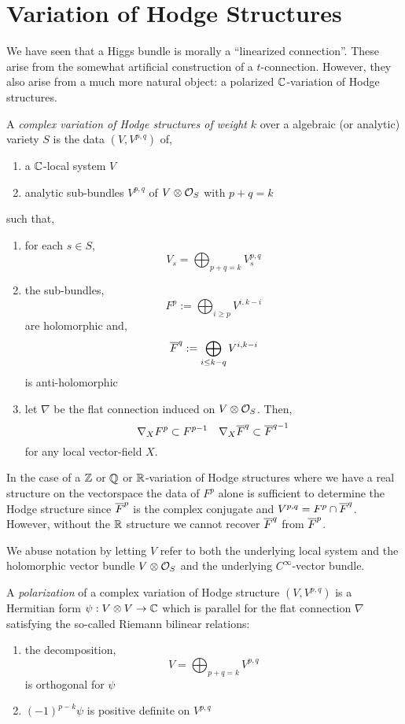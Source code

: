 \documentclass[12pt]{article}
\begin{document}
\section{Variation of Hodge Structures}

We have seen that a Higgs bundle is morally a ``linearized connection''. These arise from the somewhat artificial construction of a $t$-connection. However, they also arise from a much more natural object: a polarized $\mathbb{C}$-variation of Hodge structures. 

\begin{defn}
A \textit{complex variation of Hodge structures of weight} $k$ over a algebraic (or analytic) variety $S$ is the data $(V, V^{p,q})$ of,
\begin{enumerate}
\item a $\mathbb{C}$-local system $V$
\item analytic sub-bundles $V^{p,q}$ of $V \otimes \mathcal{O}_{S}$ with $p + q = k$
\end{enumerate}
such that,
\begin{enumerate}
\item for each $s \in S$,
\[ V_s = \bigoplus_{p+q=k} V^{p,q}_s \]
\item the sub-bundles,
\[ F^p := \bigoplus_{i \ge p} V^{i, k - i} \]
are holomorphic and,
\[ \overline{F}^q := \bigoplus_{i \le k-q} V^{i, k-i} \]
is anti-holomorphic
\item let $\nabla$ be the flat connection induced on $V \otimes \mathcal{O}_{S}$. Then,
\[ \nabla_X F^p \subset F^{p-1} \quad \nabla_X \overline{F}^q \subset \overline{F}^{q-1} \]
for any local vector-field $X$. 
\end{enumerate}
\end{defn}

\begin{rmk}
In the case of a $\mathbb{Z}$ or $\mathbb{Q}$ or $\mathbb{R}$-variation of Hodge structures where we have a real structure on the vectorspace the data of $F^p$ alone is sufficient to determine the Hodge structure since $\overline{F}^p$ is the complex conjugate and $V^{p,q} = F^p \cap \overline{F}^q$. However, without the $\mathbb{R}$ structure we cannot recover $\overline{F}^q$ from $\overline{F}^p$.
\end{rmk}

We abuse notation by letting $V$ refer to both the underlying local system and the holomorphic vector bundle $V \otimes \mathcal{O}_{S}$ and the underlying $C^{\infty}$-vector bundle.

\begin{defn}
A \textit{polarization} of a complex variation of Hodge structure $(V, V^{p,q})$ is a Hermitian form $\psi : V \otimes V \to \mathbb{C}$ which is parallel for the flat connection $\nabla$ satisfying the so-called Riemann bilinear relations:
\begin{enumerate}
\item the decomposition,
\[ V = \bigoplus_{p+q = k} V^{p,q} \]
is orthogonal for $\psi$
\item $(-1)^{p-k} \psi$ is positive definite on $V^{p,q}$
\end{enumerate}
\end{defn}
\end{document}
